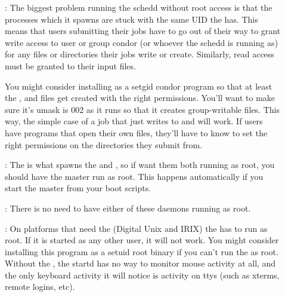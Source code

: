 \begin{description}
\item[] : The biggest problem running the schedd
    without root access is that the  processes which it
    spawns are stuck with the same UID the  has.  This
    means that users submitting their jobs have to go out of their way
    to grant write access to user or group condor (or whoever the
    schedd is running as) for any files or directories their jobs
    write or create.  Similarly, read access must be granted to their
    input files.

    You might consider installing  as a setgid condor
    program so that at least the ,  and
     files get created with the right permissions.
    You'll want to make sure it's umask is 002 as it runs so that it
    creates group-writable files.  This way, the simple case of a job
    that just writes to  and  will work.  If
    users have programs that open their own files, they'll have to
    know to set the right permissions on the directories they submit
    from.

\item[] : The  is what spawns the
     and , so if want them both running
    as root, you should have the master run as root.  This happens
    automatically if you start the master from your boot scripts.

\item[]
\item[] : There is no need to have either of these
daemons running as root.

\item[] : On platforms that need the 
    (Digital Unix and IRIX) the  has to run as root.  If
    it is started as any other user, it will not work.  You might
    consider installing this program as a setuid root binary if you
    can't run the  as root.  Without the ,
    the startd has no way to monitor mouse activity at all, and the
    only keyboard activity it will notice is activity on ttys (such as
    xterms, remote logins, etc).

\end{description}